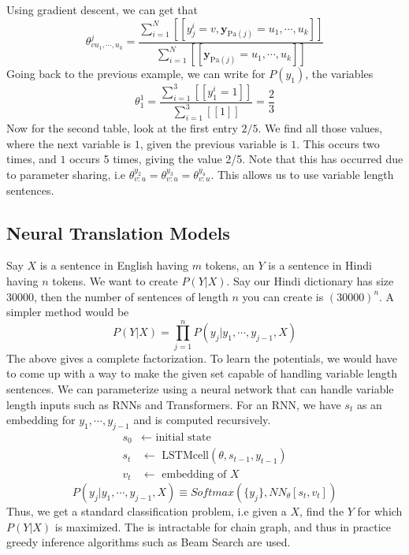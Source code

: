 Using gradient descent, we can get that
\begin{equation}
	\theta^j_{vu_1, \cdots, u_k} = \dfrac{\sum_{i=1}^N [\![y_j^i = v, \mathbf{y}_{\text{Pa}(j)} = u_1, \cdots, u_k]\!]}{\sum_{i=1}^N[\![\mathbf{y}_{\text{Pa}(j)} = u_1, \cdots, u_k]\!] }
\end{equation}
Going back to the previous example, we can write for $P(y_1)$, the variables 
\[\theta_1^1 = \dfrac{\sum_{i=1}^3 [\![y_1^i=1]\!]}{\sum_{i=1}^3 [\![1]\!]} = \dfrac{2}{3}\] 
Now for the second table, look at the first entry $2/5$. We find all those values, where the next variable is $1$, given the  previous variable is $1$. This occurs two times, and $1$ occurs 5 times, giving the value 2/5. Note that this has occurred due to parameter sharing, i.e $\theta^{y_2}_{v:u} = \theta^{y_3}_{v:u} = \theta^{y_4}_{v:u}$. This allows us to use variable length sentences. 
\subsection{Neural Translation Models}
Say $X$ is a sentence in English having $m$ tokens, an $Y$ is a sentence in Hindi having $n$ tokens. We want to create $P(Y|X)$. Say our Hindi dictionary has size $30000$, then the number of sentences of length $n$ you can create is $(30000)^n$. A simpler method would be 
\begin{equation}
	P(Y|X) = \prod_{j=1}^n P(y_j|y_1, \cdots, y_{j-1}, X)
\end{equation}
The above gives a complete factorization. To learn the potentials, we would have to come up with a way to make the given set capable of handling variable length sentences. We can parameterize using a neural network that can handle variable length inputs such as RNNs and Transformers. For an RNN, we have $s_t$ as an embedding for $y_1, \cdots, y_{j-1}$ and is computed recursively.
\begin{align*}
	s_0 &\longleftarrow \text{ initial state} \\
	s_t &\longleftarrow \text{ LSTMcell}(\theta, s_{t-1}, y_{t-1}) \\
	v_t &\longleftarrow \text{ embedding of } X
\end{align*}
\[P(y_j | y_1, \cdots, y_{j-1}, X) \equiv Softmax(\{y_j\}, NN_\theta [s_t, v_t])\]
Thus, we get a standard classification problem, i.e given a $X$, find the $Y$ for which $P(Y|X)$ is maximized. The is intractable for chain graph, and thus in practice greedy inference algorithms such as Beam Search are used.

